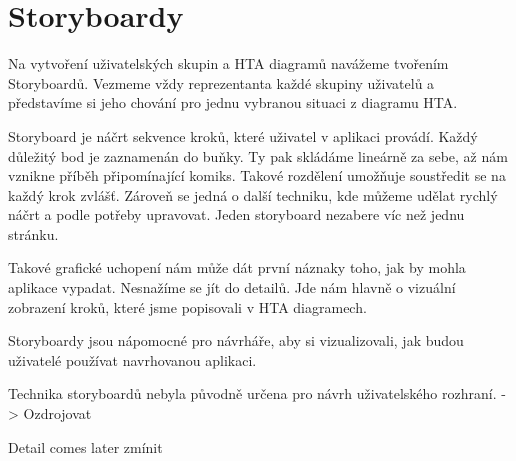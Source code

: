 \chapter{Storyboardy}


Na vytvoření uživatelských skupin a HTA diagramů navážeme tvořením Storyboardů. Vezmeme vždy reprezentanta každé skupiny uživatelů a představíme si jeho chování pro jednu vybranou situaci z diagramu HTA.


Storyboard je náčrt sekvence kroků, které uživatel v aplikaci provádí. Každý důležitý bod je zaznamenán do buňky. Ty pak skládáme lineárně za sebe, až nám vznikne příběh připomínající komiks. Takové rozdělení umožňuje soustředit se na každý krok zvlášť. Zároveň se jedná o další techniku, kde můžeme udělat rychlý náčrt a podle potřeby upravovat. Jeden storyboard nezabere víc než jednu stránku.

Takové grafické uchopení nám může dát první náznaky toho, jak by mohla aplikace vypadat. Nesnažíme se jít do detailů. Jde nám hlavně o vizuální zobrazení kroků, které jsme popisovali v HTA diagramech.

Storyboardy jsou nápomocné pro návrháře, aby si vizualizovali, jak budou uživatelé používat navrhovanou aplikaci. 

Technika storyboardů nebyla původně určena pro návrh uživatelského rozhraní. -> Ozdrojovat

Detail comes later zmínit
